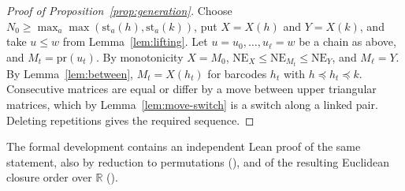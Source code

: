 \documentclass[11pt,a4paper]{article}
\theoremstyle{definition}
\theoremstyle{remark}
\numberwithin{equation}{section}
\newcommand{\R}{\mathbb{R}}
\begin{document}
\begin{proof}[Proof of Proposition~\ref{prop:generation}]
Choose $N_0\ge\max_a\max(\mathrm{st}_a(h),\mathrm{st}_a(k))$, put $X=X(h)$ and $Y=X(k)$, and take $u\le w$ from Lemma~\ref{lem:lifting}. Let $u=u_0,\dots,u_\ell=w$ be a chain as above, and $M_t=\mathrm{pr}(u_t)$. By monotonicity $X=M_0$, $\mathrm{NE}_X\le\mathrm{NE}_{M_t}\le\mathrm{NE}_Y$, and $M_\ell=Y$. By Lemma~\ref{lem:between}, $M_t=X(h_t)$ for barcodes $h_t$ with $h\preceq h_t\preceq k$. Consecutive matrices are equal or differ by a move between upper triangular matrices, which by Lemma~\ref{lem:move-switch} is a switch along a linked pair. Deleting repetitions gives the required sequence.
\end{proof}

The formal development contains an independent Lean proof of the same statement, also by reduction to permutations (), and of the resulting Euclidean closure order over $\R$ ().
\end{document}
